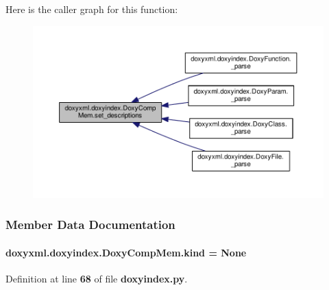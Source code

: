 Here is the caller graph for this function\+:
\nopagebreak
\begin{figure}[H]
\begin{center}
\leavevmode
\includegraphics[width=350pt]{d6/d58/classdoxyxml_1_1doxyindex_1_1DoxyCompMem_ad00868ed8b33454cb704c6f6e5488fbd_icgraph}
\end{center}
\end{figure}




\subsubsection{Member Data Documentation}
\paragraph[{kind}]{\setlength{\rightskip}{0pt plus 5cm}doxyxml.\+doxyindex.\+Doxy\+Comp\+Mem.\+kind = None\hspace{0.3cm}{\ttfamily [static]}}\label{classdoxyxml_1_1doxyindex_1_1DoxyCompMem_a1022102246031bd109e484cefcaf9809}


Definition at line {\bf 68} of file {\bf doxyindex.\+py}.



